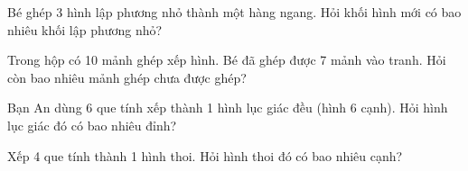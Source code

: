 \begin{ex} %
Bé ghép 3 hình lập phương nhỏ thành một hàng ngang. Hỏi khối hình mới có bao nhiêu khối lập phương nhỏ?
\end{ex}

\begin{ex} %
Trong hộp có 10 mảnh ghép xếp hình. Bé đã ghép được 7 mảnh vào tranh. Hỏi còn bao nhiêu mảnh ghép chưa được ghép?
\end{ex}

\begin{ex} %
Bạn An dùng 6 que tính xếp thành 1 hình lục giác đều (hình 6 cạnh). Hỏi hình lục giác đó có bao nhiêu đỉnh?
\end{ex}

\begin{ex} %
Xếp 4 que tính thành 1 hình thoi. Hỏi hình thoi đó có bao nhiêu cạnh?
\end{ex}
